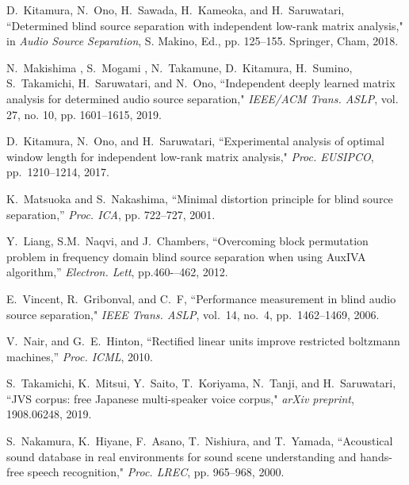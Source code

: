 \documentclass[honka]{nitkagawathesis}%
\begin{document}
\begin{thebibliography}{99}
  D.~Kitamura, N.~Ono, H.~Sawada, H.~Kameoka, and H.~Saruwatari, ``Determined blind source separation with independent low-rank matrix analysis," in  {\em Audio Source Separation}, S. Makino, Ed., pp. 125--155. Springer, Cham, 2018.
  
  N.~Makishima , S.~Mogami , N.~Takamune, D.~Kitamura, H.~Sumino, S.~Takamichi, H.~Saruwatari, and N.~Ono, ``Independent deeply learned matrix analysis for determined audio source separation,"  {\em IEEE/ACM Trans. ASLP}, vol. 27, no. 10, pp. 1601--1615, 2019.
  
  D.~Kitamura, N.~Ono, and H.~Saruwatari, ``Experimental analysis of optimal window length for independent low-rank matrix analysis,"  {\em Proc. EUSIPCO}, pp.~1210--1214, 2017.
  
  
  K.~Matsuoka and S.~Nakashima, ``Minimal distortion principle for blind source separation,'' {\em Proc. ICA}, pp. 722--727, 2001.
  
  Y.~Liang, S.M.~Naqvi, and J.~Chambers, ``Overcoming block permutation
  problem in frequency domain blind source separation when using
  AuxIVA algorithm,'' {\em Electron. Lett}, pp.460-–462, 2012.
  
  E.~Vincent, R.~Gribonval, and C.~F, ``Performance measurement in blind audio source separation," {\em IEEE Trans. ASLP}, vol.~14, no.~4, pp.~1462--1469, 2006.
  
  V.~Nair, and G.~E.~Hinton, ``Rectified linear units improve restricted boltzmann machines,'' 
  {\em Proc. ICML}, 2010.
  
  S.~Takamichi, K.~Mitsui, Y.~Saito, T.~Koriyama, N.~Tanji, and H.~Saruwatari, ``JVS corpus: free Japanese multi-speaker voice corpus,"  {\em arXiv preprint}, 1908.06248, 2019.
  
  S.~Nakamura, K.~Hiyane, F.~Asano, T.~Nishiura, and T.~Yamada, ``Acoustical sound database in real environments for sound scene understanding and hands-free speech recognition,"  {\em Proc. LREC}, pp. 965--968, 2000.
  

\end{thebibliography}
\end{document}
